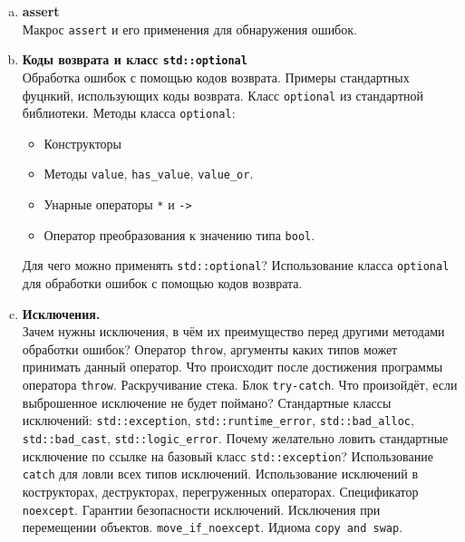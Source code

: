 \documentclass{article}
\begin{document}
\begin{enumerate}
\begin{enumerate}[a.]
\item \textbf{assert}\\
Макрос \texttt{assert} и его применения для обнаружения ошибок.

\item \textbf{Коды возврата и класс \texttt{std::optional}}\\
Обработка ошибок с помощью кодов возврата. Примеры стандартных фуцнкий, использующих коды возврата.
Класс \texttt{optional} из стандартной библиотеки.
Методы класса \texttt{optional}:
\begin{itemize}
\item Конструкторы
\item Методы \texttt{value}, \texttt{has\_value}, \texttt{value\_or}.
\item Унарные операторы \texttt{*} и \texttt{->}
\item Оператор преобразования к значению типа \texttt{bool}.
\end{itemize}
Для чего можно применять \texttt{std::optional}? Использование класса \texttt{optional} для обработки ошибок с помощью кодов возврата.


\item \textbf{Исключения.}\\
Зачем нужны исключения, в чём их преимущество перед другими методами обработки ошибок?
Оператор \texttt{throw}, аргументы каких типов может принимать данный оператор. Что происходит после достижения программы оператора \texttt{throw}. Раскручивание стека. Блок \texttt{try-catch}. Что произойдёт, если выброшенное исключение не будет поймано? Стандартные классы исключений: \texttt{std::exception}, \texttt{std::runtime\_error}, \texttt{std::bad\_alloc}, \texttt{std::bad\_cast}, \texttt{std::logic\_error}. Почему желательно ловить стандартные исключение по ссылке на базовый класс \texttt{std::exception}? Использование \texttt{catch} для ловли всех типов исключений. Использование исключений в кострукторах, деструкторах, перегруженных операторах. Спецификатор \texttt{noexcept}. Гарантии безопасности исключений. Исключения при перемещении объектов. \texttt{move\_if\_noexcept}. Идиома \texttt{copy and swap}.

\end{enumerate}
\end{enumerate}
\end{document}
